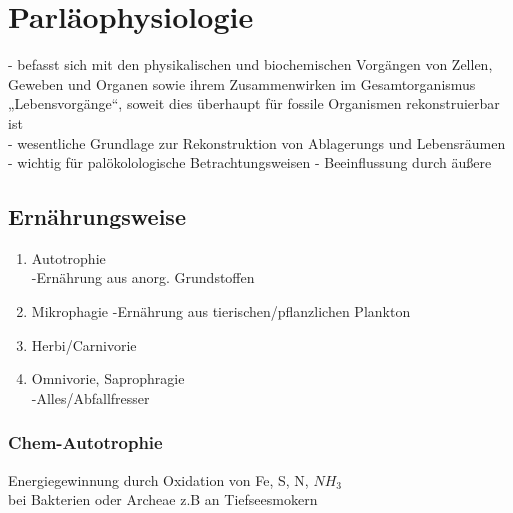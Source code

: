 \documentclass[a4paper,12pt]{scrartcl}
\begin{document}
\section{Parläophysiologie}
- befasst sich mit den physikalischen und biochemischen Vorgängen von Zellen, Geweben und Organen sowie ihrem Zusammenwirken im Gesamtorganismus „Lebensvorgänge“, soweit dies überhaupt für fossile Organismen rekonstruierbar ist\\
- wesentliche Grundlage zur Rekonstruktion von Ablagerungs und Lebensräumen
- wichtig für palökolologische Betrachtungsweisen
- Beeinflussung durch äußere



\subsection{Ernährungsweise}
\begin{enumerate}
\item Autotrophie\\
-Ernährung aus anorg. Grundstoffen
\item Mikrophagie
-Ernährung aus tierischen/pflanzlichen Plankton
\item Herbi/Carnivorie
\item Omnivorie, Saprophragie\\
-Alles/Abfallfresser
\end{enumerate}

\subsubsection{Chem-Autotrophie}
Energiegewinnung durch Oxidation von Fe, S, N, $NH_3$\\
bei Bakterien oder Archeae z.B an Tiefseesmokern\\
\end{document}
